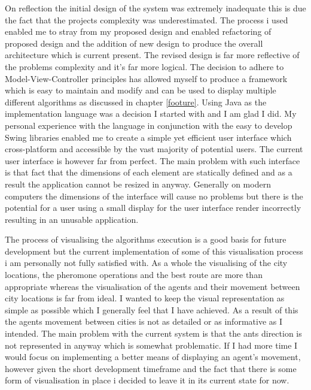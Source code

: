 On reflection the initial design of the system was extremely inadequate this is due the fact that the projects complexity was underestimated. The process i used enabled me to stray from my proposed design and enabled refactoring of proposed design and the addition of new design to produce the overall architecture which is current present. The revised design is far more reflective of the problems complexity and it’s far more logical. The decision to adhere to Model-View-Controller principles has allowed myself to produce a framework which is easy to maintain and modify and can be used to display multiple different algorithms as discussed in chapter \ref{footure}. Using Java as the implementation language was a decision I started with and I am glad I did. My personal experience with the language in conjunction with the easy to develop Swing libraries enabled me to create a simple yet efficient user interface which cross-platform and accessible by the vast majority of potential users. The current user interface is however far from perfect. The main problem with such interface is that fact that the dimensions of each element are statically defined and as a result the application cannot be resized in anyway. Generally on modern computers the dimensions of the interface will cause no problems but there is the potential for a user using a small display for the user interface render incorrectly resulting in an unusable application.

The process of visualising the algorithms execution is a good basis for future development but the current implementation of some of this visualisation process i am personally not fully satisfied with. As a whole the visualising of the city locations, the pheromone operations and the best route are more than appropriate whereas the visualisation of the agents and their movement between city locations is far from ideal. I wanted to keep the visual representation as simple as possible which I generally feel that I have achieved. As a result of this the agents movement between cities is not as detailed or as informative as I intended. The main problem with the current system is that the ants direction is not represented in anyway which is somewhat problematic. If I had more time I would focus on implementing a better means of displaying an agent’s movement, however given the short development timeframe and the fact that there is some form of visualisation in place i decided to leave it in its current state for now.

